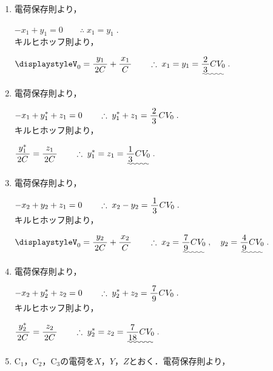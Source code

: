 \documentclass[../../../uem_phy_std_a.tex]{subfiles}
\begin{document}
    \begin{enumerate}
        \item 電荷保存則より，

            \myspaceb%
            $\displaystyle%
                -x_1 + y_1 = 0 \qquad \therefore \; x_1 = y_1 \;. 
            $\\
            キルヒホッフ則より，
            
            \myspaceb%
            $\displaystyle%
                V_0 = \myfracc{y_1}{2C} +  \myfracc{x_1}{C}%
                \qquad \therefore \; x_1 = y_1 = \uwave{\myfraca{2}{3} CV_0} \;.
            $
        \item 電荷保存則より，
            
            \myspaceb%
            $\displaystyle%
                -x_1 + y^*_1 + z_1 = 0%
                \qquad \therefore \; y^*_1 + z_1 = \myfraca{2}{3} CV_0 \;.
            $\\
            キルヒホッフ則より，
            
            \myspaceb%
            $\displaystyle%
                \myfracc{y^*_1}{2C} = \myfracc{z_1}{2C}%
                \qquad \therefore \; y^*_1 = z_1 = \uwave{\myfraca{1}{3} CV_0} \;.
            $
        \item 電荷保存則より，
            
            \myspaceb%
            $\displaystyle%
                -x_2 + y_2 + z_1 = 0%
                \qquad \therefore \; x_2 - y_2 = \myfraca{1}{3} CV_0 \;.
            $\\
            キルヒホッフ則より，
            
            \myspaceb%
            $\displaystyle%
                V_0 = \myfracc{y_2}{2C} +  \myfracc{x_2}{C}%
                \qquad \therefore \; x_2 = \uwave{\myfraca{7}{9} CV_0} \;,%
                \quad y_2 = \uwave{\myfraca{4}{9} CV_0} \;.
            $
        \item 電荷保存則より，
            
            \myspaceb%
            $\displaystyle%
                -x_2 + y^*_2 + z_2 = 0%
                \qquad \therefore \; y^*_2 + z_2 = \myfraca{7}{9} CV_0 \;.
            $\\
            キルヒホッフ則より，
            
            \myspaceb%
            $\displaystyle%
                \myfracc{y^*_2}{2C} = \myfracc{z_2}{2C}%
                \qquad \therefore \; y^*_2 = z_2 = \uwave{\myfraca{7}{18} CV_0} \;.
            $
        \item C$_1$，C$_2$，C$_3$の電荷を$X$，$Y$，$Z$とおく．電荷保存則より，
            

\end{enumerate}
\end{document}

